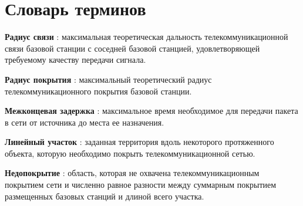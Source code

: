 \chapter*{Словарь терминов}             %


\textbf{Радиус связи} : максимальная теоретическая дальность телекоммуникационной связи базовой станции с соседней базовой станцией, удовлетворяющей требуемому качеству передачи сигнала.

\textbf{Радиус покрытия} : максимальный теоретический радиус телекоммуникационного покрытия базовой станции.

\textbf{Межконцевая задержка} : максимальное время необходимое для передачи пакета в сети от источника до места ее назначения.

\textbf{Линейный участок} : заданная территория вдоль некоторого протяженного объекта, которую необходимо покрыть телекоммуникационной сетью.

\textbf{Недопокрытие} : область, которая не охвачена телекоммуникационным покрытием сети и численно равное разности между суммарным покрытием размещенных базовых станций и длиной всего участка.